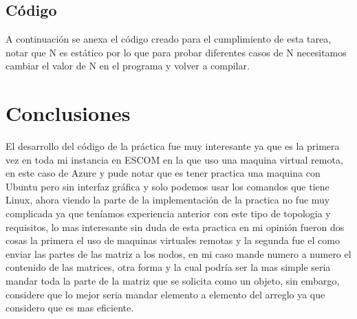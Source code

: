 \documentclass[11pt]{article}
\begin{document}
		\subsection{Código}
	A continuación se anexa el código creado para el cumplimiento de esta tarea, notar que N es estático por lo que para probar diferentes casos de N necesitamos cambiar el valor de N en el programa y volver a compilar.
	
	\section{Conclusiones}
	El desarrollo del código de la práctica fue muy interesante ya que es la primera vez en toda mi  instancia en ESCOM en la que uso una maquina virtual remota, en este caso de Azure y pude notar que es tener practica una maquina con Ubuntu pero sin interfaz gráfica y solo podemos usar los comandos que tiene Linux, ahora viendo la parte de la implementación de la practica no fue muy complicada ya que teníamos experiencia anterior con este tipo de topologia y requisitos, lo mas interesante sin duda de esta practica en mi opinión fueron dos cosas la primera el uso de maquinas virtuales remotas y la segunda fue el como enviar las partes de las matriz a los nodos, en mi caso mande numero a numero el contenido de las matrices, otra forma y la cual podría ser la mas simple seria mandar toda la parte de la matriz que se solicita como un objeto, sin embargo, considere que lo mejor seria mandar elemento a elemento del arreglo ya que considero que es mas eficiente.
\end{document}
